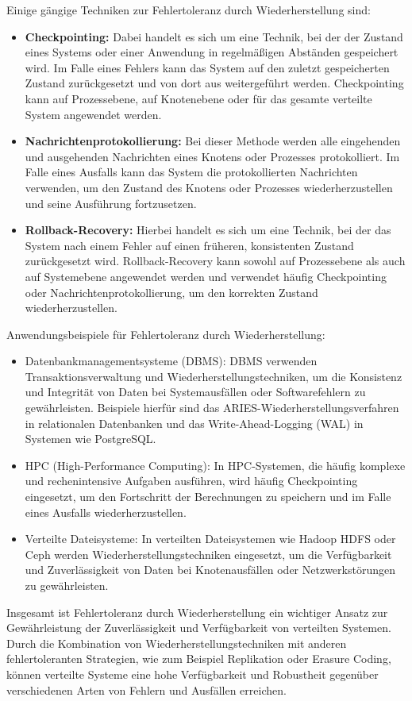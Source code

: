 \documentclass[../vs-script-first-v01.tex]{subfiles}
\begin{document}
Einige gängige Techniken zur Fehlertoleranz durch Wiederherstellung sind:
\begin{itemize}
\item \textbf{Checkpointing:} Dabei handelt es sich um eine Technik, bei der der Zustand eines Systems oder einer Anwendung in regelmäßigen Abständen gespeichert wird. Im Falle eines Fehlers kann das System auf den zuletzt gespeicherten Zustand zurückgesetzt und von dort aus weitergeführt werden. Checkpointing kann auf Prozessebene, auf Knotenebene oder für das gesamte verteilte System angewendet werden.
\item \textbf{Nachrichtenprotokollierung:} Bei dieser Methode werden alle eingehenden und ausgehenden Nachrichten eines Knotens oder Prozesses protokolliert. Im Falle eines Ausfalls kann das System die protokollierten Nachrichten verwenden, um den Zustand des Knotens oder Prozesses wiederherzustellen und seine Ausführung fortzusetzen.
\item \textbf{Rollback-Recovery:} Hierbei handelt es sich um eine Technik, bei der das System nach einem Fehler auf einen früheren, konsistenten Zustand zurückgesetzt wird. Rollback-Recovery kann sowohl auf Prozessebene als auch auf Systemebene angewendet werden und verwendet häufig Checkpointing oder Nachrichtenprotokollierung, um den korrekten Zustand wiederherzustellen.
\end{itemize}  
Anwendungsbeispiele für Fehlertoleranz durch Wiederherstellung:
\begin{itemize}
\item Datenbankmanagementsysteme (DBMS): DBMS verwenden Transaktionsverwaltung und Wiederherstellungstechniken, um die Konsistenz und Integrität von Daten bei Systemausfällen oder Softwarefehlern zu gewährleisten. Beispiele hierfür sind das ARIES-Wiederherstellungsverfahren in relationalen Datenbanken und das Write-Ahead-Logging (WAL) in Systemen wie PostgreSQL.
\item HPC (High-Performance Computing): In HPC-Systemen, die häufig komplexe und rechenintensive Aufgaben ausführen, wird häufig Checkpointing eingesetzt, um den Fortschritt der Berechnungen zu speichern und im Falle eines Ausfalls wiederherzustellen.
\item Verteilte Dateisysteme: In verteilten Dateisystemen wie Hadoop HDFS oder Ceph werden Wiederherstellungstechniken eingesetzt, um die Verfügbarkeit und Zuverlässigkeit von Daten bei Knotenausfällen oder Netzwerkstörungen zu gewährleisten.
\end{itemize} 
Insgesamt ist Fehlertoleranz durch Wiederherstellung ein wichtiger Ansatz zur Gewährleistung der Zuverlässigkeit und Verfügbarkeit von verteilten Systemen. Durch die Kombination von Wiederherstellungstechniken mit anderen fehlertoleranten Strategien, wie zum Beispiel Replikation oder Erasure Coding, können verteilte Systeme eine hohe Verfügbarkeit und Robustheit gegenüber verschiedenen Arten von Fehlern und Ausfällen erreichen.
\end{document}
